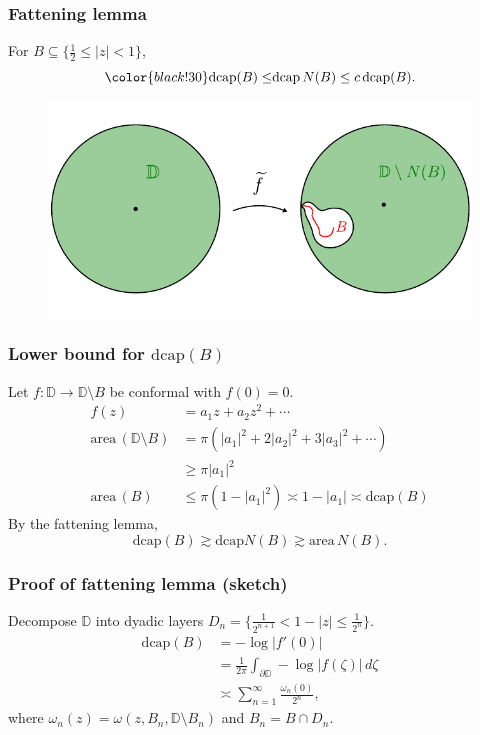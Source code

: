 \documentclass[xcolor=pdftex,dvipsnames,table]{beamer}
\newcommand{\bbD}{\mathbb{D}}
\newcommand{\go}{\omega}
\newcommand{\gz}{\zeta}
\newcommand{\area}{\text{area}\,}
\newcommand{\dcap}{\text{dcap}}
\theoremstyle{definition}
\begin{document}
\begin{frame}
  \frametitle{Fattening lemma}
  \begin{lemma}
    For $B \subseteq \{ \frac{1}{2} \leq \left| z \right| < 1 \}$,
    \[
        {\color{black!30} \dcap(B) \leq} \dcap \, N(B) \leq c \, \dcap(B).
    \]  
  \end{lemma}
  \begin{figure}
    \includegraphics[scale=0.8]{fattening_04.pdf}
  \end{figure}
\end{frame}

\begin{frame}
  \frametitle{Lower bound for $\dcap(B)$}
  Let $f \colon \bbD \to \bbD \setminus B$ be conformal with $f(0) = 0$.
  \[
      \begin{aligned}
          f(z) &= a_1 z + a_2 z^2 + \cdots \\
          \area(\bbD \setminus B) &= \pi \left( \left|a_1\right|^2 + 2 \left|a_2\right|^2 + 3 \left|a_3\right|^2 + \cdots \right) \\
                                                      &\geq \pi \left| a_1\right|^2 \\
           \area(B) &\leq \pi (1 - \left|a_1\right|^2) \asymp 1 - \left| a_1 \right| \asymp \dcap(B)                                           
      \end{aligned}
  \]
  By the fattening lemma,
  \[
      \dcap (B) \gtrsim \dcap N(B) \gtrsim \area N(B).
  \]    
\end{frame}

\begin{frame}
  \frametitle{Proof of fattening lemma (sketch)}
  Decompose $\bbD$ into dyadic layers $D_n = \{ \frac{1}{2^{n+1}} < 1 - \left|z\right| \leq \frac{1}{2^n} \}$.
   \[
      \begin{aligned}
          \dcap(B) &= - \log \left| f'(0) \right| \\
          &= \frac{1}{2 \pi} \int_{\partial \bbD} - \log \left| f(\gz) \right| \, d\gz \\
          &\asymp \sum_{n=1}^{\infty} \frac{\go_n(0)}{2^n},
      \end{aligned}
  \]
  where $\go_n(z) = \go(z, B_n, \bbD \setminus B_n)$ and $B_n = B \cap D_n$.
\end{frame}
\end{document}
